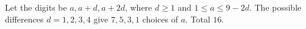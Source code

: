 Let the digits be $a,a+d,a+2d$, where $d\ge1$ and $1\le a\le9-2d$. The possible differences $d=1,2,3,4$ give $7,5,3,1$ choices of $a$. Total $\boxed{16}$.

